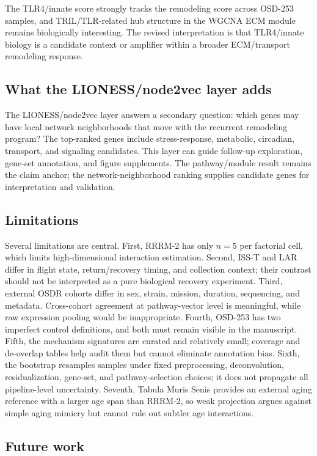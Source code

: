 \documentclass[11pt]{article}
\begin{document}
The TLR4/innate score strongly tracks the remodeling score across OSD-253 samples, and TRIL/TLR-related hub structure in the WGCNA ECM module remains biologically interesting. The revised interpretation is that TLR4/innate biology is a candidate context or amplifier within a broader ECM/transport remodeling response.

\subsection{What the LIONESS/node2vec layer adds}

The LIONESS/node2vec layer answers a secondary question: which genes may have local network neighborhoods that move with the recurrent remodeling program? The top-ranked genes include stress-response, metabolic, circadian, transport, and signaling candidates. This layer can guide follow-up exploration, gene-set annotation, and figure supplements. The pathway/module result remains the claim anchor; the network-neighborhood ranking supplies candidate genes for interpretation and validation.

\subsection{Limitations}

Several limitations are central. First, RRRM-2 has only $n=5$ per factorial cell, which limits high-dimensional interaction estimation. Second, ISS-T and LAR differ in flight state, return/recovery timing, and collection context; their contrast should not be interpreted as a pure biological recovery experiment. Third, external OSDR cohorts differ in sex, strain, mission, duration, sequencing, and metadata. Cross-cohort agreement at pathway-vector level is meaningful, while raw expression pooling would be inappropriate. Fourth, OSD-253 has two imperfect control definitions, and both must remain visible in the manuscript. Fifth, the mechanism signatures are curated and relatively small; coverage and de-overlap tables help audit them but cannot eliminate annotation bias. Sixth, the bootstrap resamples samples under fixed preprocessing, deconvolution, residualization, gene-set, and pathway-selection choices; it does not propagate all pipeline-level uncertainty. Seventh, Tabula Muris Senis provides an external aging reference with a larger age span than RRRM-2, so weak projection argues against simple aging mimicry but cannot rule out subtler age interactions.

\subsection{Future work}
\end{document}
